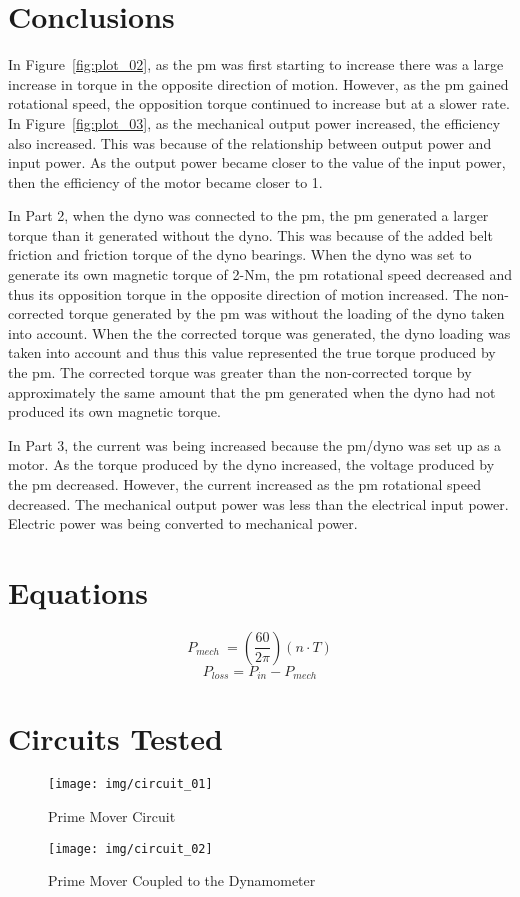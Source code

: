 \documentclass{article}
\begin{document}
\section{Conclusions}

In Figure~\ref{fig:plot_02}, as the \gls{pm} was first starting to increase
there was a large increase in torque in the opposite direction of motion.
However, as the \gls{pm} gained rotational speed, the opposition torque
continued to increase but at a slower rate. In Figure~\ref{fig:plot_03}, as the
mechanical output power increased, the efficiency also increased. This was
because of the relationship between output power and input power. As the output
power became closer to the value of the input power, then the efficiency of the
motor became closer to 1.

In Part 2, when the \gls{dyno} was connected to the \gls{pm}, the \gls{pm}
generated a larger torque than it generated without the \gls{dyno}. This was
because of the added belt friction and friction torque of the \gls{dyno}
bearings.  When the \gls{dyno} was set to generate its own magnetic torque of
2-Nm, the \gls{pm} rotational speed decreased and thus its opposition torque in
the opposite direction of motion increased. The non-corrected torque generated
by the \gls{pm} was without the loading of the \gls{dyno} taken into account.
When the the corrected torque was generated, the \gls{dyno} loading was taken
into account and thus this value represented the true torque produced by the
\gls{pm}. The corrected torque was greater than the non-corrected torque by
approximately the same amount that the \gls{pm} generated when the \gls{dyno}
had not produced its own magnetic torque.

In Part 3, the current was being increased because the \gls{pm}/\gls{dyno} was
set up as a motor. As the torque produced by the \gls{dyno} increased, the
voltage produced by the \gls{pm} decreased. However, the current increased as
the \gls{pm} rotational speed decreased. The mechanical output power was less
than the electrical input power. Electric power was being converted to
mechanical power.

\section*{Equations}

\[P_{mech}\ = \left( \frac{60}{2\pi} \right) (n \cdot T)\]
\[P_{loss} = P_{in} - P_{mech}\]

\section*{Circuits Tested}

\begin{figure}[H]
  \centering
  \texttt{[image: img/circuit\_01]}
  \caption{Prime Mover Circuit}
  \label{fig:circuit_01}
\end{figure}

\begin{figure}[H]
  \centering
  \texttt{[image: img/circuit\_02]}
  \caption{Prime Mover Coupled to the Dynamometer}
  \label{fig:circuit_02}
\end{figure}
\end{document}
